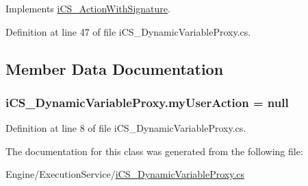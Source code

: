 Implements \hyperlink{classi_c_s___action_with_signature_ab62366545f5e9079753a1292a3a76354}{i\+C\+S\+\_\+\+Action\+With\+Signature}.



Definition at line 47 of file i\+C\+S\+\_\+\+Dynamic\+Variable\+Proxy.\+cs.



\subsection{Member Data Documentation}
\hypertarget{classi_c_s___dynamic_variable_proxy_ac4a6206c4de58db2fa18ce80b428c901}{
\subsubsection[{my\+User\+Action}]{ i\+C\+S\+\_\+\+Dynamic\+Variable\+Proxy.\+my\+User\+Action = null\hspace{0.3cm}{\ttfamily [protected]}}}\label{classi_c_s___dynamic_variable_proxy_ac4a6206c4de58db2fa18ce80b428c901}


Definition at line 8 of file i\+C\+S\+\_\+\+Dynamic\+Variable\+Proxy.\+cs.



The documentation for this class was generated from the following file\+:\begin{DoxyCompactItemize}
\item 
Engine/\+Execution\+Service/\hyperlink{i_c_s___dynamic_variable_proxy_8cs}{i\+C\+S\+\_\+\+Dynamic\+Variable\+Proxy.\+cs}\end{DoxyCompactItemize}
